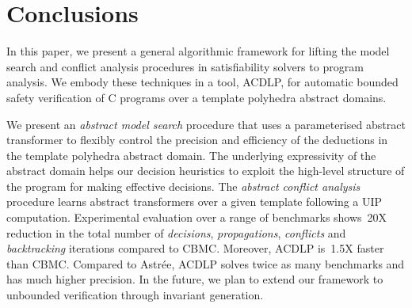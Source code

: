 \section{Conclusions}
In this paper, we present a general algorithmic framework for lifting 
the model search and conflict analysis procedures in satisfiability 
solvers to program analysis.  We embody these techniques in a tool, ACDLP,  
for automatic bounded safety verification of C programs over a template 
polyhedra abstract domains.  

We present an {\em abstract model search} procedure that uses a 
parameterised abstract transformer to flexibly control the precision and 
efficiency of the deductions in the template polyhedra abstract domain. 
The underlying expressivity of the abstract domain helps our decision 
heuristics to exploit the high-level structure of the program for making 
effective decisions.  The {\em abstract conflict analysis} procedure learns 
abstract transformers over a given template following a UIP computation.
Experimental evaluation over a range of benchmarks shows~20X
reduction in the total number of {\em decisions}, {\em propagations}, 
{\em conflicts} and {\em backtracking} iterations compared to CBMC.  Moreover, 
ACDLP is~1.5X faster than CBMC.  Compared to Astr{\'e}e, ACDLP solves twice
as many benchmarks and has much higher precision. In the future, we plan to extend 
our framework to unbounded verification through invariant generation. 


